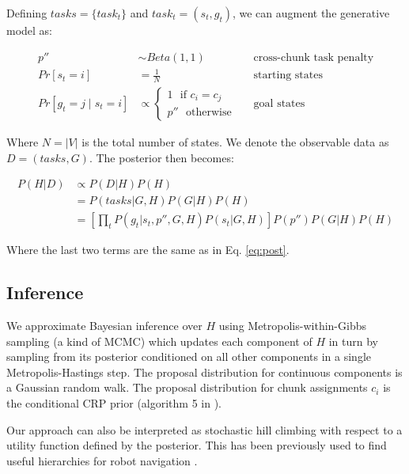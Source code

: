 \documentclass[11pt]{article}
\begin{document}
Defining $tasks = \{task_t\}$ and $task_t = (s_t,g_t)$, we can augment the generative model as:

\begin{align*}
    p'' &\sim Beta(1,1)		&& \text{cross-chunk task penalty} \\
    Pr[s_t = i] &= \frac{1}{N}		&& \text{starting states} \\
    Pr[g_t = j \mid s_t = i] &\propto \begin{cases} 1 \,\,\text{ if } c_i = c_j  \\ p'' \,\,\text{ otherwise} \end{cases} 		&& \text{goal states} 
\end{align*}

Where $N = |V|$ is the total number of states. We denote the observable data as $D = (tasks, G)$. The posterior then becomes:

\begin{align}
    P(H|D) &\propto P(D|H) P(H) \\ 
    &= P(tasks|G,H) P(G|H) P(H) \\
    &= \left[ \prod_t P(g_t|s_t,p'',G,H) P(s_t|G,H) \right] P(p'') P(G|H) P(H)
\end{align}

Where the last two terms are the same as in Eq. \ref{eq:post}.

\subsection{Inference}

We approximate Bayesian inference over $H$ using Metropolis-within-Gibbs sampling \cite{roberts2009examples} (a kind of MCMC) which updates each component of $H$ in turn by sampling from its posterior conditioned on all other components in a single Metropolis-Hastings step. The proposal distribution for continuous components is a Gaussian random walk. The proposal distribution for chunk assignments $c_i$ is the conditional CRP prior (algorithm 5 in \cite{neal2000markov}).

Our approach can also be interpreted as stochastic hill climbing with respect to a utility function defined by the posterior. This has been previously used to find useful hierarchies for robot navigation \cite{fernandez2013multi}.
\end{document}

